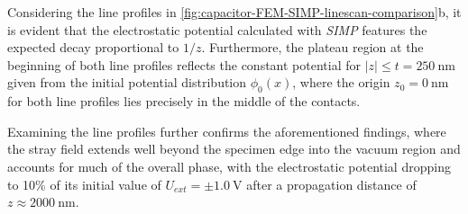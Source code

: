 Considering the line profiles in \cref{fig:capacitor-FEM-SIMP-linescan-comparison}b, it is evident that the electrostatic potential calculated with \emph{SIMP} features the expected decay proportional to $1/z$. Furthermore, the plateau region at the beginning of both line profiles reflects the constant potential for $\lvert z \rvert \le t = \SI{250}{\nm}$ given from the initial potential distribution $\phi_0 \left(x\right)$, where the origin $z_0 = \SI{0}{\nm}$ for both line profiles lies precisely in the middle of the contacts.

Examining the line profiles further confirms the aforementioned findings, where the stray field extends well beyond the specimen edge into the vacuum region and accounts for much of the overall phase, with the electrostatic potential dropping to 10\% of its initial value of $U_{\mathit{ext}} = \pm \SI{1.0}{\volt}$ after a propagation distance of $z \approx \SI{2000}{\nm}$.

